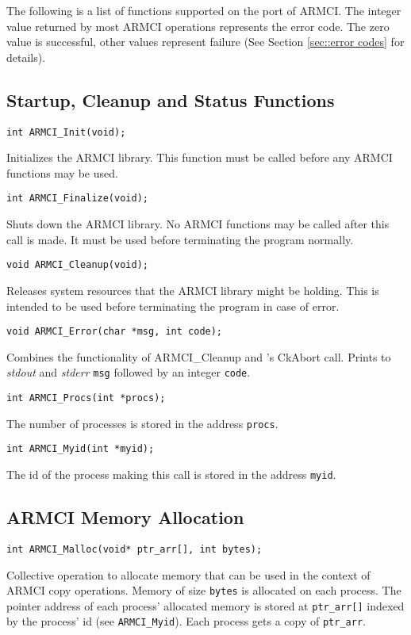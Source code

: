 \documentclass[10pt]{article}
\begin{document}
The following is a list of functions supported on the \charmpp{} port
of ARMCI. The integer value returned by most ARMCI operations
represents the error code. The zero value is successful, other values
represent failure (See Section \ref{sec::error codes} for details).

\subsection{Startup, Cleanup and Status Functions}

\begin{verbatim}
int ARMCI_Init(void);
\end{verbatim}
Initializes the ARMCI library. This function must be called before any
ARMCI functions may be used.

\begin{verbatim}
int ARMCI_Finalize(void);
\end{verbatim}
Shuts down the ARMCI library. No ARMCI functions may be called after
this call is made. It must be used before terminating the program normally.

\begin{verbatim}
void ARMCI_Cleanup(void);
\end{verbatim}
Releases system resources that the ARMCI library might be holding. This is
intended to be used before terminating the program in case of error.

\begin{verbatim}
void ARMCI_Error(char *msg, int code);
\end{verbatim}
Combines the functionality of ARMCI\_Cleanup and \charmpp{}'s CkAbort
call. Prints to {\em stdout} and {\em stderr} {\tt msg} followed by an
integer {\tt code}.

\begin{verbatim}
int ARMCI_Procs(int *procs);
\end{verbatim}
The number of processes is stored in the address {\tt procs}.

\begin{verbatim}
int ARMCI_Myid(int *myid);
\end{verbatim}
The id of the process making this call is stored in the address {\tt myid}.

\subsection{ARMCI Memory Allocation}

\begin{verbatim}
int ARMCI_Malloc(void* ptr_arr[], int bytes);
\end{verbatim}
Collective operation to allocate memory that can be used in the
context of ARMCI copy operations. Memory of size {\tt bytes} is
allocated on each process. The pointer address of each process'
allocated memory is stored at {\tt ptr\_arr[]} indexed by the process'
id (see {\tt ARMCI\_Myid}). Each process gets a copy of {\tt ptr\_arr}.
\end{document}
